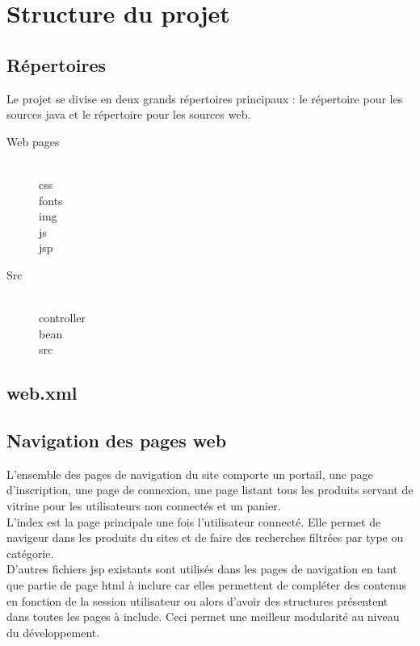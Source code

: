 \section{Structure du projet}

\subsection{Répertoires}

Le projet se divise en deux grands répertoires principaux : le répertoire pour 
les sources java et le répertoire pour les sources web.

\begin{description}
	\item[Web pages] \hfill \\
		css \\
		fonts \\
		img \\
		js \\
		jsp
	\item[Src] \hfill \\
		controller \\
		bean \\
		src
\end{description}

\subsection{web.xml}



\subsection{Navigation des pages web}

L'ensemble des pages de navigation du site comporte un portail, une page 
d'inscription, une page de connexion, une page listant tous les produits servant 
de vitrine pour les utilisateurs non connectés et un panier. \\

L'index est la page principale une fois l'utilisateur connecté. Elle permet de 
navigeur dans les produits du sites et de faire des recherches filtrées par 
type ou catégorie. \\

D'autres fichiers jsp existants sont utilisés dans les pages de navigation en 
tant que partie de page html à inclure car elles permettent de compléter des 
contenus en fonction de la session utilisateur ou alors d'avoir des structures 
présentent dans toutes les pages à include. Ceci permet une meilleur modularité 
au niveau du développement.

